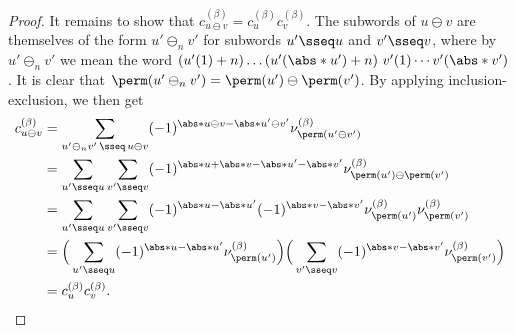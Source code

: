 \begin{proof}
It remains to show that $c^{(\beta)}_{u\ominus v} = c^{(\beta)}_u c^{(\beta)}_v$.
The subwords of $u\ominus v$ are themselves of the form $u'\ominus_n v'$ for subwords $u'\sseq u$ and $v'\sseq v$,
where by $u'\ominus_n v'$ we mean the word $(u'(1)+n)\dots (u'(\abs*{u'})+n)\ v'(1)\cdots v'(\abs*{v'})$.
It is clear that $\perm(u'\ominus_n v') = \perm(u')\ominus \perm(v')$.
By applying inclusion-exclusion, we then get \begin{align*}
    c^{(\beta)}_{u\ominus v}
    &= \sum_{u'\ominus_n v'\, \sseq\, u\ominus v}
    (-1)^{\abs*{u\ominus v} - \abs*{u'\ominus v'}}
    \nu^{(\beta)}_{\perm(u'\ominus v')} \\
    &= \sum_{u'\sseq u} \sum_{v'\sseq v}
    (-1)^{\abs*{u} + \abs*{v} - \abs*{u'} - \abs*{v'}}
    \nu^{(\beta)}_{\perm(u')\ominus \perm(v')} \\
    &= \sum_{u'\sseq u} \sum_{v'\sseq v}
    (-1)^{\abs*{u}-\abs*{u'}} (-1)^{\abs*{v}-\abs*{v'}}  
    \nu^{(\beta)}_{\perm(u')} \nu^{(\beta)}_{\perm(v')} \\
    &= \Big(
        \sum_{u'\sseq u}
        (-1)^{\abs*{u}-\abs*{u'}} \nu^{(\beta)}_{\perm(u')}
    \Big)
    \Big(
        \sum_{v'\sseq v}
        (-1)^{\abs*{v}-\abs*{v'}} \nu^{(\beta)}_{\perm(v')}
    \Big) \\
    &= c^{(\beta)}_u c^{(\beta)}_v. \qedhere
\end{align*}
\end{proof}




